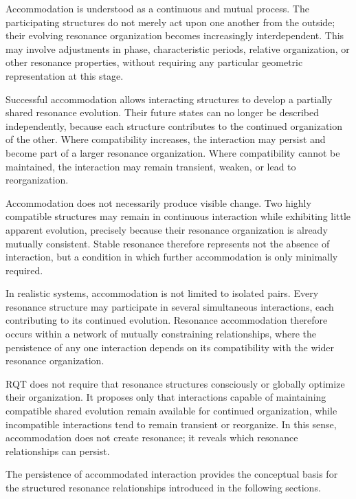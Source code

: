 \documentclass[11pt,a4paper]{article}
\begin{document}
Accommodation is understood as a continuous and mutual process. The participating structures do not merely act upon one another from the outside; their evolving resonance organization becomes increasingly interdependent. This may involve adjustments in phase, characteristic periods, relative organization, or other resonance properties, without requiring any particular geometric representation at this stage.

Successful accommodation allows interacting structures to develop a partially shared resonance evolution. Their future states can no longer be described independently, because each structure contributes to the continued organization of the other. Where compatibility increases, the interaction may persist and become part of a larger resonance organization. Where compatibility cannot be maintained, the interaction may remain transient, weaken, or lead to reorganization.

Accommodation does not necessarily produce visible change. Two highly compatible structures may remain in continuous interaction while exhibiting little apparent evolution, precisely because their resonance organization is already mutually consistent. Stable resonance therefore represents not the absence of interaction, but a condition in which further accommodation is only minimally required.

In realistic systems, accommodation is not limited to isolated pairs. Every resonance structure may participate in several simultaneous interactions, each contributing to its continued evolution. Resonance accommodation therefore occurs within a network of mutually constraining relationships, where the persistence of any one interaction depends on its compatibility with the wider resonance organization.

RQT does not require that resonance structures consciously or globally optimize their organization. It proposes only that interactions capable of maintaining compatible shared evolution remain available for continued organization, while incompatible interactions tend to remain transient or reorganize. In this sense, accommodation does not create resonance; it reveals which resonance relationships can persist.

The persistence of accommodated interaction provides the conceptual basis for the structured resonance relationships introduced in the following sections.

\end{document}
